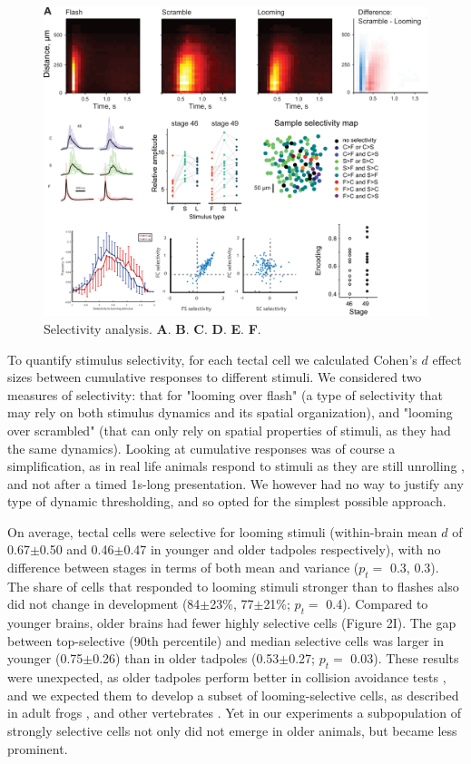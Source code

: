 \documentclass{article}
\begin{document}
\begin{figure}[t]
\includegraphics[width=\linewidth]{fig2.pdf}
\caption{
Selectivity analysis. \textbf{A}. \textbf{B}. \textbf{C}. \textbf{D}. \textbf{E}. \textbf{F}. }
\end{figure}

To quantify stimulus selectivity, for each tectal cell we calculated Cohen’s $d$ effect sizes between cumulative responses to different stimuli. We considered two measures of selectivity: that for "looming over flash" (a type of selectivity that may rely on both stimulus dynamics and its spatial organization), and "looming over scrambled" (that can only rely on spatial properties of stimuli, as they had the same dynamics). Looking at cumulative responses was of course a simplification, as in real life animals respond to stimuli as they are still unrolling \citep{peron2009adaptation,khakhalin2014}, and not after a timed 1s-long presentation. We however had no way to justify any type of dynamic thresholding, and so opted for the simplest possible approach.

On average, tectal cells were selective for looming stimuli (within-brain mean $d$ of 0.67$\pm$0.50 and 0.46$\pm$0.47 in younger and older tadpoles respectively), with no difference between stages in terms of both mean and variance ($p_t=$ 0.3, 0.3). The share of cells that responded to looming stimuli stronger than to flashes also did not change in development (84$\pm$23\%, 77$\pm$21\%; $p_t=$ 0.4). Compared to younger brains, older brains had fewer highly selective cells (Figure 2I). The gap between top-selective (90th percentile) and median selective cells was larger in younger (0.75$\pm$0.26) than in older tadpoles (0.53$\pm$0.27; $p_t=$ 0.03). These results were unexpected, as older tadpoles perform better in collision avoidance tests \citep{dong2009}, and we expected them to develop a subset of looming-selective cells, as described in adult frogs \citep{nakagawa2010otneurons,baranauskas2012}, and other vertebrates \citep{wang1992pigeon,wu2005pigeon,liu2011cat}. Yet in our experiments a subpopulation of strongly selective cells not only did not emerge in older animals, but became less prominent.
\end{document}
